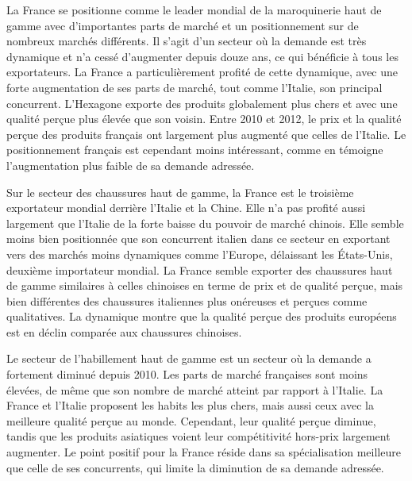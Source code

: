 \documentclass[french,10pt,a4paper]{article}
\begin{document}
\bigskip

La France se positionne comme le leader mondial de la maroquinerie haut de gamme avec d'importantes parts de marché et un positionnement sur de nombreux marchés différents. Il s'agit d'un secteur où la demande est très dynamique et n'a cessé d'augmenter depuis douze ans, ce qui bénéficie à tous les exportateurs. La France a particulièrement profité de cette dynamique, avec une forte augmentation de ses parts de marché, tout comme l'Italie, son principal concurrent. L'Hexagone exporte des produits globalement plus chers et avec une qualité perçue plus élevée que son voisin. Entre 2010 et 2012, le prix et la qualité perçue des produits français ont largement plus augmenté que celles de l'Italie. Le positionnement français est cependant moins intéressant, comme en témoigne l'augmentation plus faible de sa demande adressée.

\bigskip

Sur le secteur des chaussures haut de gamme, la France est le troisième exportateur mondial derrière l'Italie et la Chine. Elle n'a pas profité aussi largement que l'Italie de la forte baisse du pouvoir de marché chinois. Elle semble moins bien positionnée que son concurrent italien dans ce secteur en exportant vers des marchés moins dynamiques comme l'Europe, délaissant les États-Unis, deuxième importateur mondial. La France semble exporter des chaussures haut de gamme similaires à celles chinoises en terme de prix et de qualité perçue, mais bien différentes des chaussures italiennes plus onéreuses et perçues comme qualitatives. La dynamique montre que la qualité perçue des produits européens est en déclin comparée aux chaussures chinoises.

\bigskip

Le secteur de l'habillement haut de gamme est un secteur où la demande a fortement diminué depuis 2010. Les parts de marché françaises sont moins élevées, de même que son nombre de marché atteint par rapport à l'Italie. La France et l'Italie proposent les habits les plus chers, mais aussi ceux avec la meilleure qualité perçue au monde. Cependant, leur qualité perçue diminue, tandis que les produits asiatiques voient leur compétitivité hors-prix largement augmenter. Le point positif pour la France réside dans sa spécialisation meilleure que celle de ses concurrents, qui limite la diminution de sa demande adressée.

\bigskip
\end{document}
